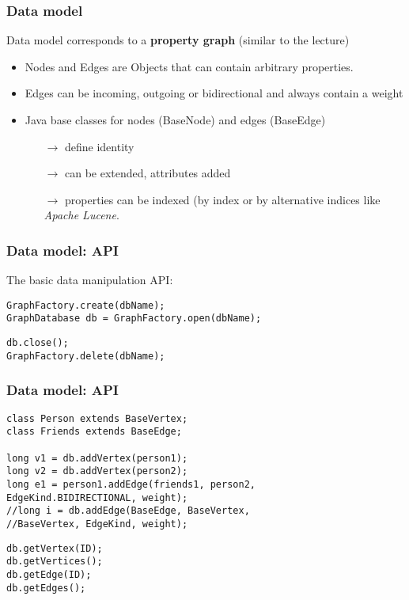 
\begin{frame}
\frametitle{Data model}

Data model corresponds to a \textbf{property graph} (similar to the lecture) \pause
\begin{itemize}
	\item Nodes and Edges are Objects that can contain arbitrary properties. \pause
	\item Edges can be incoming, outgoing or bidirectional and always contain a weight \pause
	\item Java base classes for nodes (BaseNode) and edges (BaseEdge)
	\begin{itemize}
		\item[$\rightarrow$] define identity
		\item[$\rightarrow$] can be extended, attributes added
		\item[$\rightarrow$] properties can be indexed (by  index
		or by alternative indices like \textit{Apache Lucene}.
	\end{itemize}
\end{itemize}

\end{frame} 

\begin{frame}[fragile]
\frametitle{Data model: API}

The basic data manipulation API:

\pause

\begin{lstlisting}[caption=(Creating / opening a DB)]
GraphFactory.create(dbName);
GraphDatabase db = GraphFactory.open(dbName);
\end{lstlisting}

\pause

\begin{lstlisting}[caption=(Closing / deleting a DB)]
db.close();
GraphFactory.delete(dbName);
\end{lstlisting}

\end{frame}

\begin{frame}[fragile]
\frametitle{Data model: API}

\begin{lstlisting}[caption=(Vertex / Edge creation)]
class Person extends BaseVertex;
class Friends extends BaseEdge;

long v1 = db.addVertex(person1);
long v2 = db.addVertex(person2);
long e1 = person1.addEdge(friends1, person2, 
EdgeKind.BIDIRECTIONAL, weight);
//long i = db.addEdge(BaseEdge, BaseVertex, 
//BaseVertex, EdgeKind, weight);
\end{lstlisting}

\pause

\begin{lstlisting}[caption=(Vertex / Edge retrieval)]
db.getVertex(ID);
db.getVertices();
db.getEdge(ID);
db.getEdges();
\end{lstlisting}

\end{frame}

